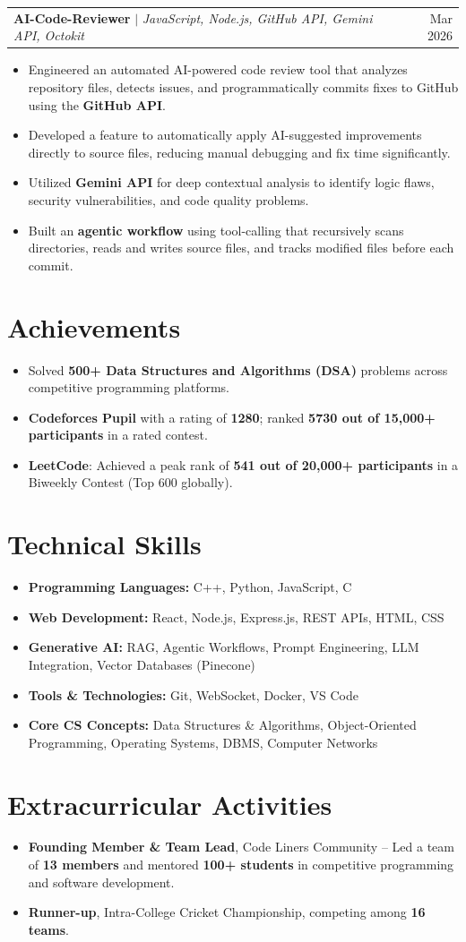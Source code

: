 \documentclass[letterpaper,11pt]{article}
\makeatletter
\newcommand{\resumeItem}[1]{\item\small{#1}}
\newcommand{\resumeProjectHeading}[3]{
  \vspace{2pt}
  \begin{tabular*}{\textwidth}{@{}p{0.78\textwidth}@{\extracolsep{\fill}}r@{}}
    \textbf{#1} $|$ \small\textit{#2} & \small #3
  \end{tabular*}\vspace{-3pt}
}
\makeatother
\begin{document}
\resumeProjectHeading
  {AI-Code-Reviewer}
  {JavaScript, Node.js, GitHub API, Gemini API, Octokit}
  {Mar 2026}
\begin{itemize}
  \resumeItem{Engineered an automated AI-powered code review tool that analyzes repository files, detects issues, and programmatically commits fixes to GitHub using the \textbf{GitHub API}.}
  \resumeItem{Developed a feature to automatically apply AI-suggested improvements directly to source files, reducing manual debugging and fix time significantly.}
  \resumeItem{Utilized \textbf{Gemini API} for deep contextual analysis to identify logic flaws, security vulnerabilities, and code quality problems.}
  \resumeItem{Built an \textbf{agentic workflow} using tool-calling that recursively scans directories, reads and writes source files, and tracks modified files before each commit.}
\end{itemize}

\section{Achievements}
\begin{itemize}
  \resumeItem{Solved \textbf{500+ Data Structures and Algorithms (DSA)} problems across competitive programming platforms.}
  \resumeItem{\textbf{Codeforces Pupil} with a rating of \textbf{1280}; ranked \textbf{5730 out of 15,000+ participants} in a rated contest.}
  \resumeItem{\textbf{LeetCode}: Achieved a peak rank of \textbf{541 out of 20,000+ participants} in a Biweekly Contest (Top 600 globally).}
\end{itemize}

\section{Technical Skills}
\begin{itemize}
  \resumeItem{\textbf{Programming Languages:} C++, Python, JavaScript, C}
  \resumeItem{\textbf{Web Development:} React, Node.js, Express.js, REST APIs, HTML, CSS}
  \resumeItem{\textbf{Generative AI:} RAG, Agentic Workflows, Prompt Engineering, LLM Integration, Vector Databases (Pinecone)}
  \resumeItem{\textbf{Tools \& Technologies:} Git, WebSocket, Docker, VS Code}
  \resumeItem{\textbf{Core CS Concepts:} Data Structures \& Algorithms, Object-Oriented Programming, Operating Systems, DBMS, Computer Networks}
\end{itemize}

\section{Extracurricular Activities}
\begin{itemize}
  \resumeItem{\textbf{Founding Member \& Team Lead}, Code Liners Community -- Led a team of \textbf{13 members} and mentored \textbf{100+ students} in competitive programming and software development.}
  \resumeItem{\textbf{Runner-up}, Intra-College Cricket Championship, competing among \textbf{16 teams}.}
\end{itemize}
\end{document}
